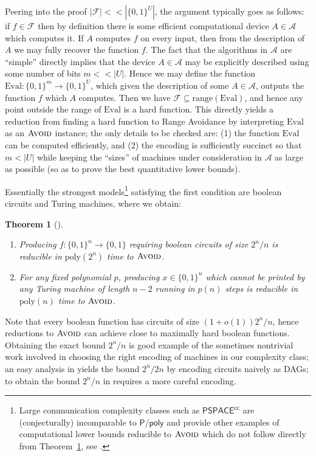 \documentclass[11pt]{article}
\newtheorem{theorem}{Theorem}
\newcommand{\B}{\{0,1\}}
\newcommand{\rng}{\mathrm{range}}
\newcommand{\poly}{\mathrm{poly}}
\newcommand{\avoid}{\textsc{Avoid}}
\begin{document}
Peering into the proof $|\mathcal{F}| << |\B^{U}|$, the argument typically goes as follows: if $f \in \mathcal{F}$ then by definition there is some efficient computational device $A \in \mathcal{A}$ which computes it. If $A$ computes $f$ on every input, then from the description of $A$ we may fully recover the function $f$. The fact that the algorithms in $\mathcal{A}$ are ``simple'' directly implies that the device $A \in \mathcal{A}$ may be explicitly described using some number of bits $m << |U|$. Hence we may define the function $\mathrm{Eval}: \B^m \to \B^U$, which given the description of some $A \in \mathcal{A}$, outputs the function $f$ which $A$ computes. Then we have $\mathcal{F} \subseteq \rng(\mathrm{Eval})$, and hence any point outside the range of $\mathrm{Eval}$ is a hard function. This directly yields a reduction from finding a hard function to Range Avoidance by interpreting $\mathrm{Eval}$ as an $\avoid$ instance; the only details to be checked are: (1) the function $\mathrm{Eval}$ can be computed efficiently, and (2) the encoding is sufficiently succinct so that $m < |U|$ while keeping the ``sizes'' of machines under consideration in $\mathcal{A}$ as large as possible (so as to prove the best quantitative lower bounds).

Essentially the strongest models\footnote{Large communication complexity classes such as $\mathsf{PSPACE^{cc}}$ are (conjecturally) incomparable to $\mathsf{P/poly}$ and provide other examples of computational lower bounds reducible to $\avoid$ which do not follow directly from Theorem~\ref{thm:tt-to-avoid}, see \cite{Korten1}.} satisfying the first condition are boolean circuits and Turing machines, where we obtain:

\begin{theorem}[\cite{Korten1,CHR}]\label{thm:tt-to-avoid}~
\begin{enumerate}
	\item Producing $f: \B^n \to \B$ requiring boolean circuits of size $2^n/n$ is reducible in $\poly(2^n)$ time to $\avoid$.
	\item For any fixed polynomial $p$, producing $x \in \B^n$ which cannot be printed by any Turing machine of length $n-2$ running in $p(n)$ steps is reducible in $\poly(n)$ time to $\avoid$.
\end{enumerate}
\end{theorem}
Note that every boolean function has circuits of size $(1+o(1))2^n/n$, hence reductions to $\avoid$ can achieve close to maximally hard boolean functions. Obtaining the exact bound $2^n/n$ is good example of the sometimes nontrivial work involved in choosing the right encoding of machines in our complexity class; an easy analysis in \cite{Korten1} yields the bound $2^n/2n$ by encoding circuits naively as DAGs; to obtain the bound $2^n/n$ in \cite{CHR} requires a more careful encoding.
\end{document}

